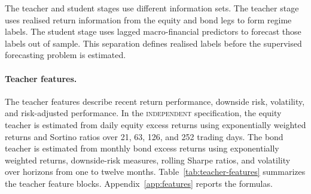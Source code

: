 \documentclass[10pt]{article}
\newcommand{\Bindep}{\textsc{independent}}
\begin{document}
The teacher and student stages use different information sets. The teacher stage uses realised return information from the equity and bond legs to form regime labels. The student stage uses lagged macro-financial predictors to forecast those labels out of sample. This separation defines realised labels before the supervised forecasting problem is estimated.

\paragraph{Teacher features.}
The teacher features describe recent return performance, downside risk, volatility, and risk-adjusted performance. In the \Bindep{} specification, the equity teacher is estimated from daily equity excess returns using exponentially weighted returns and Sortino ratios over 21, 63, 126, and 252 trading days. The bond teacher is estimated from monthly bond excess returns using exponentially weighted returns, downside-risk measures, rolling Sharpe ratios, and volatility over horizons from one to twelve months. Table~\ref{tab:teacher-features} summarizes the teacher feature blocks. Appendix~\ref{app:features} reports the formulas.
\end{document}
